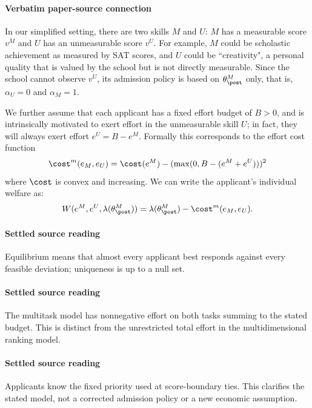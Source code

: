 \documentclass[10pt]{article}
\begin{document}
\paragraph{Verbatim paper-source connection}
\begin{ReviewVerbatim}
In our simplified setting, there are two skills $M$ and $U$: $M$ has a measurable score $v^M$ and $U$ has an unmeasurable score $v^U$. For example, $M$ could be scholastic achievement as measured by SAT scores, and $U$ could be ``creativity", a personal quality that is valued by the school but is not directly measurable.
%
Since the school cannot observe $v^U$, its admission policy is based on $\theta_\post^M$ only, that is, $\alpha_U = 0$ and $\alpha_M = 1$.

We further assume that each applicant has a fixed effort budget of $B > 0$, and is intrinsically motivated to exert effort in the unmeasurable skill $U$; in fact, they will always exert effort $e^U = B - e^M$. Formally this corresponds to the effort cost function \[\cost^m(e_M, e_U) = \cost(e^M) - (\max(0,B-(e^M+e^U)))^2\] where $\cost$ is convex and increasing. We can write the applicant's individual welfare as:
\begin{equation*}
W(e^M, e^U, \lambda(\theta_\post^M)) = \lambda(\theta_\post^M) - \cost^m(e_M, e_U).
\end{equation*}
\end{ReviewVerbatim}

\paragraph{Settled source reading}
\begin{sloppypar}
Equilibrium means that almost every applicant best responds against every feasible deviation;\allowbreak{} uniqueness is up to a null set.\allowbreak{}
\end{sloppypar}
\paragraph{Settled source reading}
\begin{sloppypar}
The multitask model has nonnegative effort on both tasks summing to the stated budget.\allowbreak{} This is distinct from the unrestricted total effort in the multidimensional ranking model.\allowbreak{}
\end{sloppypar}
\paragraph{Settled source reading}
\begin{sloppypar}
Applicants know the fixed priority used at score-\allowbreak{}boundary ties.\allowbreak{} This clarifies the stated model, not a corrected admission policy or a new economic assumption.\allowbreak{}
\end{sloppypar}
\end{document}
